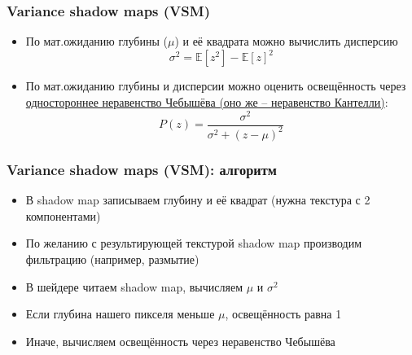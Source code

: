 \documentclass{beamer}
\begin{document}
\begin{frame}[fragile]
\frametitle{Variance shadow maps (VSM)}
\begin{itemize}
\item По мат.ожиданию глубины (\begin{math}\mu\end{math}) и её квадрата можно вычислить дисперсию
\begin{equation}
\sigma^2 = \mathbb{E}[z^2] - \mathbb{E}[z]^2
\end{equation}
\pause
\item По мат.ожиданию глубины и дисперсии можно оценить освещённость через \href{https://en.wikipedia.org/wiki/Cantelli%27s_inequality}{одностороннее неравенство Чебышёва (оно же -- неравенство Кантелли)}:
\begin{equation}
P(z) = \frac{\sigma^2}{\sigma^2 + (z - \mu)^2}
\end{equation}
\end{itemize}
\end{frame}

\begin{frame}[fragile]
\frametitle{Variance shadow maps (VSM): алгоритм}
\begin{itemize}
\item В shadow map записываем глубину и её квадрат (нужна текстура с 2 компонентами)
\pause
\item По желанию с результирующей текстурой shadow map производим фильтрацию (например, размытие)
\pause
\item В шейдере читаем shadow map, вычисляем \begin{math}\mu\end{math} и \begin{math}\sigma^2\end{math}
\pause
\item Если глубина нашего пикселя меньше \begin{math}\mu\end{math}, освещённость равна 1
\pause
\item Иначе, вычисляем освещённость через неравенство Чебышёва
\end{itemize}
\end{frame}
\end{document}
